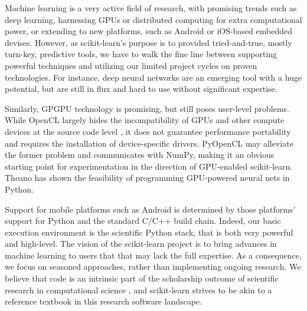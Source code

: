 \documentclass[a4paper]{article}
\begin{document}
Machine learning is a very active field of research, with promising
trends such as deep learning, harnessing GPUs or distributed computing
for extra computational power, or extending to new platforms, such as
Android or iOS-based embedded devises. However, as scikit-learn's purpose
is to provided tried-and-true, mostly turn-key, predictive tools, we have
to walk the fine line between supporting powerful techniques and
utilizing our limited project cycles on proven technologies. For
instance, deep neural networks are an emerging tool with a huge
potential, but are still in flux and hard to use without significant expertise.

Similarly, GPGPU technology is promising, but still poses user-level problems.
While OpenCL largely hides the incompatibility of GPUs and other compute devices
at the source code level \cite{stone2010opencl}, it does not guarantee performance portability
and requires the installation of device-specific drivers.
PyOpenCL \cite{klockner2012pycuda} may alleviate the former problem and communicates
with NumPy, making it an obvious starting point for experimentation
in the direction of GPU-enabled scikit-learn. Theano \cite{bergstra2010theano} has
shown the feasibility of programming GPU-powered neural nets in Python.

Support for mobile platforms such as Android is determined by those platforms'
support for Python and the standard C/C++ build chain. Indeed, our basic
execution environment is the scientific Python stack, that is both very
powerful and high-level. The vision of the scikit-learn project is to
bring advances in machine learning to users that that may lack the full
expertise. As a consequence, we focus on seasoned approaches, rather than
implementing ongoing research. We believe that code is an intrinsic part
of the scholarship outcome of scientific research in computational
science \cite{buckheit1995wavelab}, and scikit-learn strives to be akin
to a reference textbook in this research software landscape.





\end{document}
